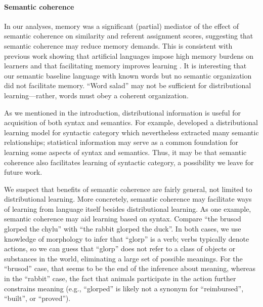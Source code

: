 \documentclass[man,floatsintext]{apa6}
\begin{document}


\paragraph{Semantic coherence}

In our analyses, memory was a significant (partial) mediator of the effect of semantic coherence on similarity and referent assignment scores, suggesting that semantic coherence may reduce memory demands. This is consistent with previous work showing that artificial languages impose high memory burdens on learners and that facilitating memory improves learning \citep{frank2011}. It is interesting that our semantic baseline language with known words but no semantic organization did not facilitate memory. ``Word salad'' may not be sufficient for distributional learning---rather, words must obey a coherent organization.

As we mentioned in the introduction, distributional information is useful for acquisition of both syntax and semantics. For example, \citet{redington1998} developed a distributional learning model for syntactic category which nevertheless extracted many semantic relationships; statistical information may serve as a common foundation for learning some aspects of syntax and semantics. Thus, it may be that semantic coherence also facilitates learning of syntactic category, a possibility we leave for future work.

 We suspect that benefits of semantic coherence are fairly general, not limited to distributional learning.  More concretely, semantic coherence may facilitate ways of learning from language itself besides distributional learning. As one example, semantic coherence may aid learning based on syntax. Compare ``the brusod glorped the chylu'' with ``the rabbit glorped the duck''. In both cases, we use knowledge of morphology to infer that ``glorp'' is a verb; verbs typically denote actions, so we can guess that ``glorp'' does not refer to a class of objects or substances in the world, eliminating a large set of possible meanings. For the ``brusod'' case, that seems to be the end of the inference about meaning, whereas in the ``rabbit'' case, the fact that animals participate in the action further constrains meaning (e.g., ``glorped'' is likely not a synonym for ``reimbursed'', ``built'', or ``proved'').
\end{document}
